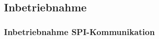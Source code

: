 \subsection{Inbetriebnahme}




%

\subsubsection{Inbetriebnahme SPI-Kommunikation}\label{Appendix:TMC4671_SPI}

%

